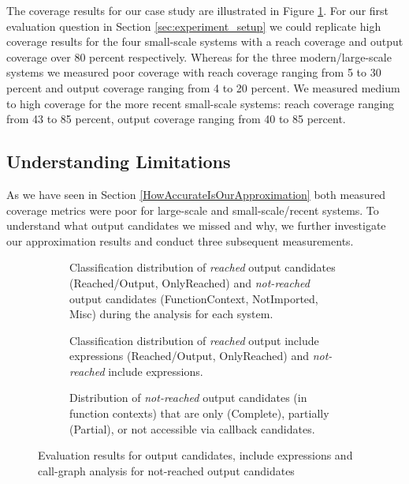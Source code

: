 \documentclass[sigconf, preprint]{acmart}
\begin{document}
The coverage results for our case study are illustrated in Figure
\ref{coverage}. For our first evaluation question in Section \ref{sec:experiment_setup} we
could replicate high coverage results for the four small-scale systems with a reach
coverage and output coverage over 80 percent respectively. Whereas for the
three modern/large-scale systems we measured poor coverage with reach coverage
ranging from 5 to 30 percent and output coverage ranging from 4 to 20 percent.
We measured medium to high coverage for the more recent small-scale systems:
reach coverage ranging from 43 to 85 percent, output coverage ranging from 40
to 85 percent.

\subsection{Understanding Limitations} \label{sec:understanding_limitations}
As we have seen in Section \ref{HowAccurateIsOurApproximation} both measured
coverage metrics were poor for large-scale and small-scale/recent systems. To
understand what output candidates we missed and why, we further investigate
our approximation results and conduct three subsequent measurements.

\begin{figure}[h!]
	\begin{subfigure}[center]{0.48\textwidth}
		
		\caption{
		Classification distribution of \emph{reached} output candidates
		(Reached/Output, OnlyReached) and \emph{not-reached} output candidates
		(FunctionContext, NotImported, Misc) during the analysis for each system.
		\label{coverage}}
	\end{subfigure}
	\vspace{1mm}
	
	\begin{subfigure}[center]{0.48\textwidth}
		
		\caption{
			Classification distribution of \emph{reached} output include expressions
			(Reached/Output, OnlyReached) and \emph{not-reached} include expressions.
			\label{fig:include_coverage_results}
		}
	\end{subfigure}
	\vspace{1mm}
	
	\begin{subfigure}[center]{0.48\textwidth}
		
		\caption{
			Distribution of \emph{not-reached} output candidates (in function contexts)
			that are only (Complete), partially (Partial), or not accessible via callback candidates. 
			\label{fig:output_candidate_explanation}
		}
		
	\end{subfigure}
	\caption{Evaluation results for output candidates, include expressions and
	call-graph analysis for not-reached output candidates}
\end{figure}
\end{document}
